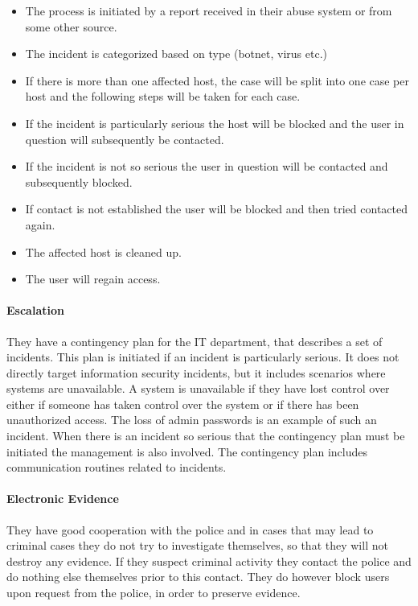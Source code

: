 \begin{itemize}\itemsep-0.2cm
\item The process is initiated by a report received in their abuse system or from some other source. 
\item The incident is categorized based on type (botnet, virus etc.)
\item If there is more than one affected host, the case will be split into one case per host and the following steps will be taken for each case.
\item If the incident is particularly serious the host will be blocked and the user in question will subsequently be contacted.
\item If the incident is not so serious the user in question will be contacted and subsequently blocked.
\item If contact is not established the user will be blocked and then tried contacted again.
\item The affected host is cleaned up.
\item The user will regain access.
\end{itemize}

\paragraph{Escalation}
They have a contingency plan for the IT department, that describes a set of incidents. This plan is initiated if an incident is particularly serious. It does not directly target information security incidents, but it includes scenarios where systems are unavailable. A system is unavailable if they have lost control over either if someone has taken control over the system or if there has been unauthorized access. The loss of admin passwords is an example of such an incident. When there is an incident so serious that the contingency plan must be initiated the management is also involved. The contingency plan includes communication routines related to incidents. 

\paragraph{Electronic Evidence}
They have good cooperation with the police and in cases that may lead to criminal cases they do not try to investigate themselves, so that they will not destroy any evidence. If they suspect criminal activity they contact the police and do nothing else themselves prior to this contact. They do however block users upon request from the police, in order to preserve evidence.

